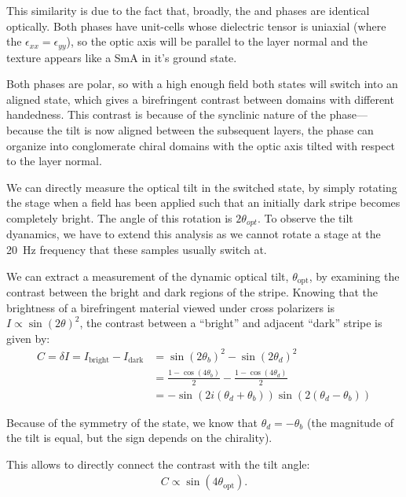 \documentclass[aagreenthesis]{subfiles}
\begin{document}
This similarity is due to the fact that, broadly, the \smcapa{} and
\smcpalpha{} phases are identical optically. Both phases have unit-cells whose dielectric tensor is uniaxial (where
the $\epsilon_{xx} = \epsilon_{yy}$), so the optic axis will be parallel to the
layer normal and the texture appears like a SmA in it's ground state.

Both phases are polar, so with a high enough field both states will switch into
an aligned \smcspf{} state, which gives a birefringent contrast between domains with different handedness. This contrast is
because of the synclinic nature of the \smcspf{} phase--- because the tilt is
now aligned between the subsequent layers, the phase can organize into
conglomerate chiral domains with the optic axis tilted with respect to the layer
normal.

We can directly measure the optical tilt in the switched state, by simply
rotating the stage when a field has been applied such that an initially dark
stripe becomes completely bright. The angle of this rotation is
$2\theta_{opt}$. To observe the tilt dyanamics, we have to extend this analysis
as we cannot rotate a stage at the \SI{20}{\hertz} frequency that these samples
usually switch at.

We can extract a measurement of the dynamic optical tilt, $\theta_\textrm{opt}$, by
examining the contrast between the bright and dark regions of the stripe.
Knowing that the brightness of a birefringent material viewed under cross
polarizers is $I \propto \sin(2\theta)^2 $, the contrast between a ``bright''
and adjacent ``dark'' stripe is given by:
\begin{align}
    C = \delta I = I_\textrm{bright} - I_\textrm{dark} &= \sin(2\theta_b)^2 -
    \sin(2\theta_d)^2 \\
&= \frac{1-\cos(4\theta_b)}{2} - \frac{1-\cos(4\theta_d)}{2} \\
&= -\sin(2i(\theta_d+\theta_b))\sin(2(\theta_d-\theta_b))
\end{align}

Because of the symmetry of the \smcspf{} state, we know that $\theta_d
=-\theta_b$ (the magnitude of the tilt is equal, but the sign depends on the
chirality).

This allows to directly connect the contrast with the tilt angle:
\begin{align}
    \label{eq:contrast-tilt}
    C \propto\sin(4\theta_\textrm{opt}).
\end{align}
\end{document}
